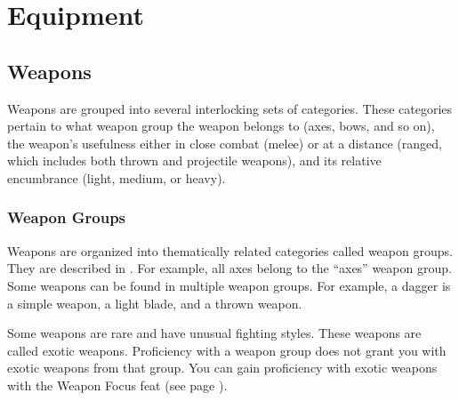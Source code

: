 \chapter{Equipment}

\section{Weapons}

Weapons are grouped into several interlocking sets of categories. These categories pertain to what weapon group the weapon belongs to (axes, bows, and so on), the weapon's usefulness either in close combat (melee) or at a distance (ranged, which includes both thrown and projectile weapons), and its relative encumbrance (light, medium, or heavy).

\subsection{Weapon Groups}

Weapons are organized into thematically related categories called weapon groups. They are described in . For example, all axes belong to the ``axes'' weapon group. Some weapons can be found in multiple weapon groups. For example, a dagger is a simple weapon, a light blade, and a thrown weapon.

\label{Exotic Weapons} Some weapons are rare and have unusual fighting styles.
These weapons are called exotic weapons.
Proficiency with a weapon group does not grant you with exotic weapons from that group.
You can gain proficiency with exotic weapons with the Weapon Focus feat (see page ).

